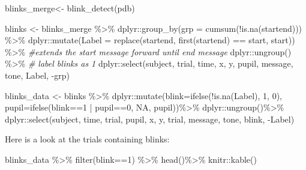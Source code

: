 \documentclass[
]{article}
\newenvironment{Shaded}{\begin{snugshade}}{\end{snugshade}}
\newcommand{\AttributeTok}[1]{\textcolor[rgb]{0.77,0.63,0.00}{#1}}
\newcommand{\CommentTok}[1]{\textcolor[rgb]{0.56,0.35,0.01}{\textit{#1}}}
\newcommand{\ConstantTok}[1]{\textcolor[rgb]{0.00,0.00,0.00}{#1}}
\newcommand{\DecValTok}[1]{\textcolor[rgb]{0.00,0.00,0.81}{#1}}
\newcommand{\FunctionTok}[1]{\textcolor[rgb]{0.00,0.00,0.00}{#1}}
\newcommand{\NormalTok}[1]{#1}
\newcommand{\OtherTok}[1]{\textcolor[rgb]{0.56,0.35,0.01}{#1}}
\newcommand{\SpecialCharTok}[1]{\textcolor[rgb]{0.00,0.00,0.00}{#1}}
\newcommand{\StringTok}[1]{\textcolor[rgb]{0.31,0.60,0.02}{#1}}
\begin{document}
\begin{Shaded}
\begin{Highlighting}[]
\NormalTok{blinks\_merge}\OtherTok{\textless{}{-}} \FunctionTok{blink\_detect}\NormalTok{(pdb)}

\NormalTok{ blinks }\OtherTok{\textless{}{-}}\NormalTok{ blinks\_merge }\SpecialCharTok{\%\textgreater{}\%}
\NormalTok{        dplyr}\SpecialCharTok{::}\FunctionTok{group\_by}\NormalTok{(}\AttributeTok{grp =} \FunctionTok{cumsum}\NormalTok{(}\SpecialCharTok{!}\FunctionTok{is.na}\NormalTok{(startend))) }\SpecialCharTok{\%\textgreater{}\%}
\NormalTok{        dplyr}\SpecialCharTok{::}\FunctionTok{mutate}\NormalTok{(}\AttributeTok{Label =} \FunctionTok{replace}\NormalTok{(startend, }\FunctionTok{first}\NormalTok{(startend) }\SpecialCharTok{==} \StringTok{\textquotesingle{}start\textquotesingle{}}\NormalTok{, }\StringTok{\textquotesingle{}start\textquotesingle{}}\NormalTok{)) }\SpecialCharTok{\%\textgreater{}\%} \CommentTok{\#extends the start message forward until end message}
\NormalTok{        dplyr}\SpecialCharTok{::}\FunctionTok{ungroup}\NormalTok{() }\SpecialCharTok{\%\textgreater{}\%}
        \CommentTok{\# label blinks as 1}
\NormalTok{        dplyr}\SpecialCharTok{::}\FunctionTok{select}\NormalTok{(subject, trial, time, x, y, pupil, message, tone,  Label, }\SpecialCharTok{{-}}\NormalTok{grp)}
 
 
\NormalTok{ blinks\_data }\OtherTok{\textless{}{-}}\NormalTok{ blinks  }\SpecialCharTok{\%\textgreater{}\%}
\NormalTok{        dplyr}\SpecialCharTok{::}\FunctionTok{mutate}\NormalTok{(}\AttributeTok{blink=}\FunctionTok{ifelse}\NormalTok{(}\SpecialCharTok{!}\FunctionTok{is.na}\NormalTok{(Label), }\DecValTok{1}\NormalTok{, }\DecValTok{0}\NormalTok{), }\AttributeTok{pupil=}\FunctionTok{ifelse}\NormalTok{(blink}\SpecialCharTok{==}\DecValTok{1} \SpecialCharTok{|}\NormalTok{ pupil}\SpecialCharTok{==}\DecValTok{0}\NormalTok{, }\ConstantTok{NA}\NormalTok{, pupil))}\SpecialCharTok{\%\textgreater{}\%}
\NormalTok{        dplyr}\SpecialCharTok{::}\FunctionTok{ungroup}\NormalTok{()}\SpecialCharTok{\%\textgreater{}\%}
\NormalTok{        dplyr}\SpecialCharTok{::}\FunctionTok{select}\NormalTok{(subject, time, trial, pupil, x, y, trial, message, tone, blink, }\SpecialCharTok{{-}}\NormalTok{Label)}
\end{Highlighting}
\end{Shaded}

Here is a look at the trials containing blinks:

\begin{Shaded}
\begin{Highlighting}[]
\NormalTok{blinks\_data }\SpecialCharTok{\%\textgreater{}\%} 
  \FunctionTok{filter}\NormalTok{(blink}\SpecialCharTok{==}\DecValTok{1}\NormalTok{) }\SpecialCharTok{\%\textgreater{}\%}
  \FunctionTok{head}\NormalTok{()}\SpecialCharTok{\%\textgreater{}\%}
\NormalTok{  knitr}\SpecialCharTok{::}\FunctionTok{kable}\NormalTok{()}
\end{Highlighting}
\end{Shaded}
\end{document}
